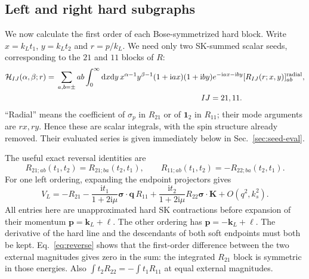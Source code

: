 \documentclass[a4paper,12pt]{article}
\newcommand{\ii}{\mathrm i}
\newcommand{\dd}{\mathrm d}
\newcommand{\bq}{\bm q}
\newcommand{\bs}{\bm\sigma}
\newcommand{\one}{\mathbf1_2}
\begin{document}
\subsection{Left and right hard subgraphs}
We now calculate the first order of each Bose-symmetrized hard block.
Write $x=k_Lt_1$, $y=k_Lt_2$ and $r=p/k_L$. We need only two
SK-summed scalar seeds, corresponding to the $21$ and $11$ blocks of $R$:
\begin{align}
 \mathcal H_{IJ}(\alpha,\beta;r)={}&\sum_{a,b=\pm}ab\int_0^\infty\dd x\dd y\,
 x^{\alpha-1}y^{\beta-1}(1+\ii ax)(1+\ii by)e^{-\ii ax-\ii by}
 [R_{IJ}(r;x,y)]^{\rm radial}_{ab},\nonumber\\
 &\hspace{65mm} IJ=21,11.
 \label{eq:hard-def}
\end{align}
``Radial'' means the coefficient of $\sigma_p$ in $R_{21}$ or of $\one$ in
$R_{11}$; their mode arguments are $rx,ry$. Hence these are scalar integrals,
with the spin structure already removed. Their evaluated series is given
immediately below in Sec.~\ref{sec:seed-eval}.

The useful exact reversal identities are
\begin{equation}
 R_{21;ab}(t_1,t_2)=R_{21;ba}(t_2,t_1),\qquad
 R_{11;ab}(t_1,t_2)=-R_{22;ba}(t_2,t_1).
 \label{eq:reverse}
\end{equation}
For one left ordering, expanding the endpoint projectors gives
\begin{equation}
 V_L=-R_{21}-\frac{\ii t_1}{1+2\ii\mu}\bs\cdot\bq\,R_{11}
                  +\frac{\ii t_2}{1+2\ii\mu}R_{22}\bs\cdot\bm K+O(q^2,k_s^2).
 \label{eq:vertex-expand}
\end{equation}
All entries here are unapproximated hard SK contractions before expansion of their
momentum $\bm p=\bm k_L+\bm\ell$. The other ordering has
$\bm p=-\bm k_L+\bm\ell$. The derivative of the hard line and the descendants
of both soft endpoints must both be kept. Eq.~\eqref{eq:reverse} shows that the
first-order difference between the two external magnitudes gives zero in the
sum: the integrated $R_{21}$ block is symmetric in those energies. Also $\int t_2R_{22}=-\int t_1R_{11}$
at equal external magnitudes.
\end{document}
